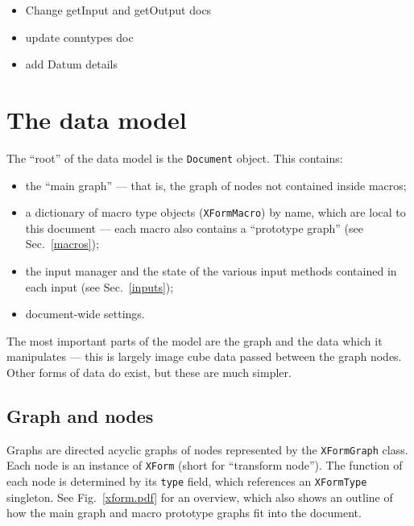 
\begin{todoblock}
\begin{itemize}
\item Change getInput and getOutput docs
\item update conntypes doc
\item add Datum details
\end{itemize}

\end{todoblock}


\section{The data model}
The ``root'' of the data model is the \texttt{Document} object.
This contains:
\begin{itemize}
\item the ``main graph'' --- that is, the graph of nodes not contained
inside macros;
\item a dictionary of macro type objects (\texttt{XFormMacro}) by name,
which are local to this document --- each macro also contains a ``prototype
graph'' (see Sec.~\ref{macros});
\item the input manager and the state of the various input methods
contained in each input (see Sec.~\ref{inputs});
\item document-wide settings.
\end{itemize}
The most important parts of the model are the graph
and the data which it manipulates --- this is largely
image cube data passed between the graph nodes.
Other forms of data do exist,
but these are much simpler.

\subsection{Graph and nodes}
Graphs are directed acyclic graphs of nodes represented by the 
\texttt{XFormGraph} class. Each node is an instance of \texttt{XForm}
(short for ``transform node''). The function of each node is
determined by its \texttt{type} field, which references an
\texttt{XFormType} singleton. See Fig.~\ref{xform.pdf} for an overview,
which also shows an outline of how the main graph and macro prototype
graphs fit into the document.

